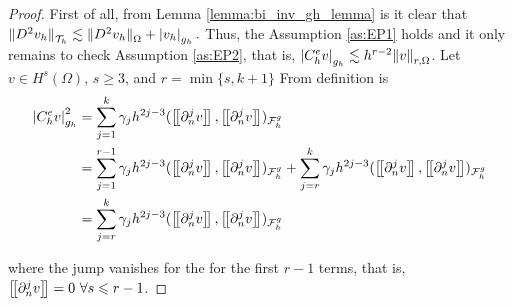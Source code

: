 \begin{proof}
    First of all, from Lemma \ref{lemma:bi_inv_gh_lemma} is it clear that \(
    \| D^2v_{h} \|_{ \mathcal{T} _{h} }^{  }  \lesssim \| D^2 v_{h} \|_{ \Omega   }^{  } + \left\lvert  v_{h}  \right\rvert _{g_{h}}.
    \)
    Thus, the Assumption \ref{as:EP1} holds and it only remains to check Assumption \ref{as:EP2}, that is, $ \left\lvert  C^{e}_{h} v  \right\rvert_{g_{h}} \lesssim h^{r-2} \| v \|_{r, \Omega   }^{  }$.
    Let $v  \in H^{s}( \Omega ) $, $s\ge 3$,  and $r = \min\{s,k+1\} $
    From definition is \[
        \begin{split}
        \abs{ C^{e}_{h} v }_{g_{h}}^{2} & = \sum_{j=1}^{k}  \gamma _{j} h^{2j-3} ( \jump{ \partial ^{j}_{n} v }, \jump{ \partial ^{j}_{n} v }  ) _{\mathcal{F}_{h}^{g} } \\
& = \sum_{j=1}^{r-1}  \gamma _{j} h^{2j-3} ( \jump{ \partial ^{j}_{n} v }, \jump{ \partial ^{j}_{n} v }  ) _{\mathcal{F}_{h}^{g} } + \sum_{j=r}^{k}  \gamma _{j} h^{2j-3} ( \jump{ \partial ^{j}_{n} v }, \jump{ \partial ^{j}_{n} v }  ) _{\mathcal{F}_{h}^{g} } \\
&= \sum_{j=r}^{k}  \gamma _{j} h^{2j-3} ( \jump{ \partial ^{j}_{n} v }, \jump{ \partial ^{j}_{n} v }  ) _{\mathcal{F}_{h}^{g} } \\
        \end{split}
    \]

    where the jump vanishes for the for the first $r-1$ terms, that is,  $\left[\!\left[  \partial ^{j}_{n} v  \right]\!\right] = 0  \  \forall s \leqslant r-1$.





\end{proof}
